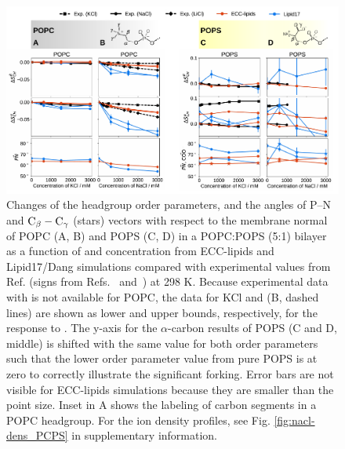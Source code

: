 \documentclass[journal=jctcce,manuscript=article]{achemso}
\newlength{\figwidth}
\newlength{\figwidthfull}
\begin{document}
\begin{figure}[tbp!] 
  \centering 
  \includegraphics[width=\figwidthfull]{../img/deltaOP_nacl_kcl_PC-PS.pdf} 
  \caption{\label{fig:delta_ordPar_monoval_PCPS}
    Changes of the headgroup order parameters, and the angles of P--N and ${\rm{C}}_\beta-{\rm{C}}_\gamma$ (stars) vectors
    with respect to the membrane normal of POPC (A, B) and POPS (C, D) in a POPC:POPS (5:1) bilayer 
    as a function of  and  concentration from ECC-lipids and Lipid17/Dang simulations 
    compared with experimental values from Ref.  (signs from Refs.~ and~) at 298 K.
    Because experimental data with  is not available for POPC, the data for KCl and  (B, dashed lines)
    are shown as lower and upper bounds, respectively, for the response to . 
    The y-axis for the $\alpha$-carbon results of POPS (C and D, middle) is shifted
    with the same value for both order parameters such that the lower order
    parameter value from pure POPS is at zero to correctly illustrate the significant forking.
    Error bars are not visible for ECC-lipids simulations because they are smaller than the point size.
    Inset in A shows the labeling of carbon segments in a POPC headgroup.
    For the ion density profiles, see Fig. \ref{fig:nacl-dens_PCPS} in supplementary information.
  }
\end{figure} 
\end{document}
